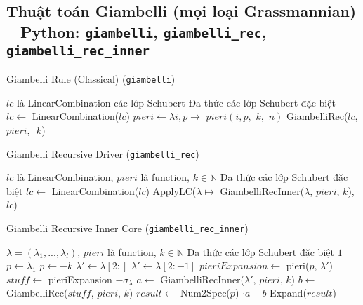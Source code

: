 
\subsection*{Thuật toán Giambelli (mọi loại Grassmannian) -- Python: \texttt{giambelli}, \texttt{giambelli\_rec}, \texttt{giambelli\_rec\_inner}}

\begin{algorithm}[H]
\caption{Giambelli Rule (Classical) (\texttt{giambelli})}
\begin{algorithmic}[1]
\REQUIRE $lc$ là LinearCombination các lớp Schubert
\ENSURE Đa thức các lớp Schubert đặc biệt
\STATE $lc \gets$ LinearCombination($lc$)
\STATE $pieri \gets \lambda i, p \to \_pieri(i, p, \_k, \_n)$
\RETURN GiambelliRec($lc$, $pieri$, $\_k$)
\end{algorithmic}
\end{algorithm}

\begin{algorithm}[H]
\caption{Giambelli Recursive Driver (\texttt{giambelli\_rec})}
\begin{algorithmic}[1]
\REQUIRE $lc$ là LinearCombination, $pieri$ là function, $k \in \mathbb{N}$
\ENSURE Đa thức các lớp Schubert đặc biệt
\STATE $lc \gets$ LinearCombination($lc$)
\RETURN ApplyLC($\lambda \mapsto$ GiambelliRecInner($\lambda$, $pieri$, $k$), $lc$)
\end{algorithmic}
\end{algorithm}

\begin{algorithm}[H]
\caption{Giambelli Recursive Inner Core (\texttt{giambelli\_rec\_inner})}
\begin{algorithmic}[1]
\REQUIRE $\lambda = (\lambda_1, ..., \lambda_l)$, $pieri$ là function, $k \in \mathbb{N}$
\ENSURE Đa thức các lớp Schubert đặc biệt
    \RETURN $1$
\ENDIF
\STATE $p \gets \lambda_1$
    \STATE $p \gets -k$
\ENDIF
\STATE $\lambda' \gets \lambda[2:]$
    \STATE $\lambda' \gets \lambda[2:-1]$
\ENDIF
\STATE $pieriExpansion \gets$ pieri($p$, $\lambda'$)
\STATE $stuff \gets$ pieriExpansion $- \sigma_\lambda$
\STATE $a \gets$ GiambelliRecInner($\lambda'$, $pieri$, $k$)
\STATE $b \gets$ GiambelliRec($stuff$, $pieri$, $k$)
\STATE $result \gets$ Num2Spec($p$) $\cdot a - b$
\RETURN Expand($result$)
\end{algorithmic}
\end{algorithm}

